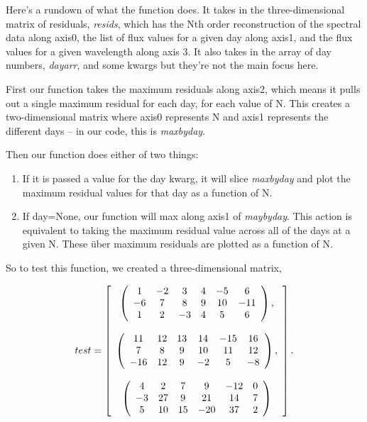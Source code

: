 \documentclass{article}
\begin{document}
Here's a rundown of what the function does.  It takes in the
three-dimensional matrix of residuals, \textit{resids}, which has the
Nth order reconstruction of the spectral data along axis0, the list of
flux values for a given day along axis1, and the flux values for a
given wavelength along axis 3.  It also takes in the array of day
numbers, \textit{dayarr}, and some kwargs but they're not the main
focus here.

First our function takes the maximum residuals along axis2, which
means it pulls out a single maximum residual for each day, for each
value of N. This creates a two-dimensional matrix where axis0
represents N and axis1 represents the different days -- in our code,
this is \textit{maxbyday}.

Then our function does either of two things:
\begin{enumerate}
\item If it is passed a value for the day kwarg, it will slice
  \textit{maxbyday} and plot the maximum residual values for that day
  as a function of N.
\item If day=None, our function will max along axis1 of \textit{maybyday}.
  This action is equivalent to taking the maximum residual value
  across all of the days at a given N.  These \"{u}ber maximum residuals
  are plotted as a function of N.
\end{enumerate}

So to test this function, we created a three-dimensional matrix,

\[test= \left[ \begin{array}[c]{c}
    
    \left( \begin{array}[c]{cccccc}
        1 & -2 & 3 & 4 & -5 & 6 \\
        -6 & 7 & 8 & 9 & 10 & -11 \\
        1 & 2 & -3 & 4 & 5 & 6
        \end{array} \right), \\

      \\

    \left( \begin{array}[c]{cccccc}
        11 & 12 & 13 & 14 & -15 & 16 \\
        7 & 8 & 9 & 10 & 11 & 12 \\
        -16 & 12 & 9 & -2 & 5 & -8 \\
        \end{array} \right), \\

      \\

    \left( \begin{array}[c]{cccccc}
        4 & 2 & 7 & 9 & -12 & 0 \\
        -3 & 27 & 9 & 21 & 14 & 7 \\
        5 & 10 & 15 & -20 & 37 & 2 \\
    \end{array} \right)

\end{array} \right]. \]
\end{document}
